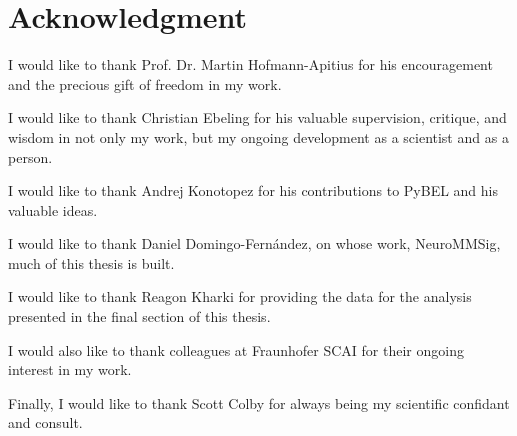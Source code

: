 \chapter*{Acknowledgment}

\begingroup
\setlength{\parskip}{1em}
		
I would like to thank Prof. Dr. Martin Hofmann-Apitius for his encouragement and the precious gift of freedom in my work.
        
I would like to thank Christian Ebeling for his valuable supervision, critique, and wisdom in not only my work, but my ongoing development as a scientist and as a person.

I would like to thank Andrej Konotopez for his contributions to PyBEL and his valuable ideas.

I would like to thank Daniel Domingo-Fernández, on whose work, NeuroMMSig, much of this thesis is built.

I would like to thank Reagon Kharki for providing the data for the analysis presented in the final section of this thesis.

I would also like to thank colleagues at Fraunhofer SCAI for their ongoing interest in my work.

Finally, I would like to thank Scott Colby for always being my scientific confidant and consult.

\endgroup
